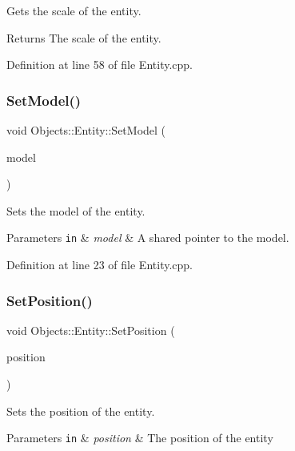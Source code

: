 Gets the scale of the entity. \begin{DoxyReturn}{Returns}
The scale of the entity. 
\end{DoxyReturn}


Definition at line 58 of file Entity.\+cpp.

\mbox{\label{class_objects_1_1_entity_a1c4c5744e19cf3c201af92c390c492c4}} 
\subsubsection{\texorpdfstring{Set\+Model()}{SetModel()}}
{\footnotesize\ttfamily void Objects\+::\+Entity\+::\+Set\+Model (\begin{DoxyParamCaption}\item[{std\+::shared\+\_\+ptr$<$ \hyperlink{class_objects_1_1_obj_model}{Objects\+::\+Obj\+Model} $>$}]{model }\end{DoxyParamCaption})}

Sets the model of the entity. 
\begin{DoxyParams}[1]{Parameters}
\mbox{\tt in}  & {\em model} & A shared pointer to the model. \\
\hline
\end{DoxyParams}


Definition at line 23 of file Entity.\+cpp.

\mbox{\label{class_objects_1_1_entity_a53612458c6bd047cbf89d4ee8bcfdf91}} 
\subsubsection{\texorpdfstring{Set\+Position()}{SetPosition()}}
{\footnotesize\ttfamily void Objects\+::\+Entity\+::\+Set\+Position (\begin{DoxyParamCaption}\item[{glm\+::vec3}]{position }\end{DoxyParamCaption})}

Sets the position of the entity. 
\begin{DoxyParams}[1]{Parameters}
\mbox{\tt in}  & {\em position} & The position of the entity \\
\hline
\end{DoxyParams}



